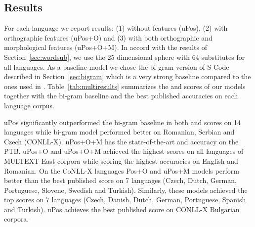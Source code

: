 \subsection{Results}
 
For each language we report results: (1) without features (uPos), (2)
with orthographic features (uPos+O) and (3) with both orthographic and
morphological features (uPos+O+M).  In accord with the results of
Section~\ref{sec:wordsub}, we use the 25 dimensional sphere with 64
substitutes for all languages.  As a baseline model we chose the
bi-gram version of S-Code described in Section~\ref{sec:bigram} which
is a very strong baseline compared to the ones used in
\cite{christodoulopoulos-goldwater-steedman:2011:EMNLP}.
Table~\ref{tab:multiresults} summarizes the \mto and \vm scores of our
models together with the bi-gram baseline and the best published
accuracies on each language corpus.

uPos significantly outperformed the bi-gram baseline in both \mto and
\vm scores on 14 languages while bi-gram model performed better on
Romanian, Serbian and Czech (CONLL-X).  uPos+O+M has the
state-of-the-art \mto and \vm accuracy on the PTB.  uPos+O and
uPos+O+M achieved the highest \mto scores on all languages of
MULTEXT-East corpora while scoring the highest \vm accuracies on
English and Romanian.  On the CoNLL-X languages Pos+O and uPos+M
models perform better than the best published \mto score on 7
languages (Czech, Dutch, German, Portuguese, Slovene, Swedish and
Turkish).  Similarly, these models achieved the top \vm scores on 7
languages (Czech, Danish, Dutch, German, Portuguese, Spanish and
Turkish).  uPos achieves the best published \mto score on CONLL-X
Bulgarian corpora.

